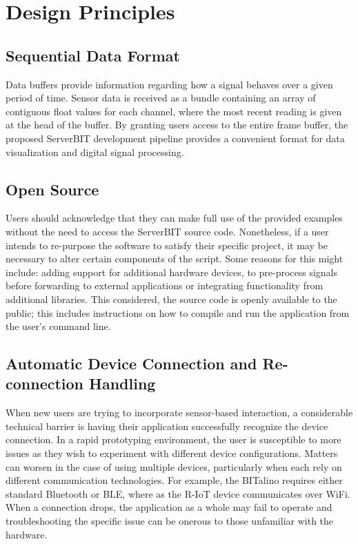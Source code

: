 \section{Design Principles}

\subsection{Sequential Data Format}
Data buffers provide information regarding how a signal behaves over a given period of time. Sensor data is received as a bundle containing an array of contiguous float values for each channel, where the most recent reading is given at the head of the buffer. By granting users access to the entire frame buffer, the proposed ServerBIT development pipeline provides a convenient format for data visualization and digital signal processing.

\subsection{Open Source}
Users should acknowledge that they can make full use of the provided examples without the need to access the ServerBIT source code. Nonetheless, if a user intends to re-purpose the software to satisfy their specific project, it may be necessary to alter certain components of the script. Some reasons for this might include: adding support for additional hardware devices, to pre-process signals before forwarding to external applications or integrating functionality from additional libraries. This considered, the source code is openly available to the public; this includes instructions on how to compile and run the application from the user's command line.

\subsection{Automatic Device Connection and Re-connection Handling}
When new users are trying to incorporate sensor-based interaction, a considerable technical barrier is having their application successfully recognize the device connection. In a rapid prototyping environment, the user is susceptible to more issues as they wish to experiment with different device configurations. Matters can worsen in the case of using multiple devices, particularly when each rely on different communication technologies. For example, the BITalino requires either standard Bluetooth or BLE, where as the R-IoT device communicates over WiFi. When a connection drops, the application as a whole may fail to operate and troubleshooting the specific issue can be onerous to those unfamiliar with the hardware.

